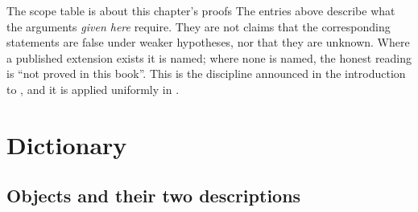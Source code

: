 \begin{warning}{The scope table is about this chapter's proofs}
The entries above describe what the arguments \emph{given here} require.
They are not claims that the corresponding statements are false under weaker
hypotheses, nor that they are unknown.  Where a published extension exists
it is named; where none is named, the honest reading is ``not proved in this
book''.  This is the discipline announced in the introduction to
, and it is applied uniformly in
.
\end{warning}

\section{Dictionary}
\label{sec:ch20-dictionary}

\subsection{Objects and their two descriptions}
\label{sec:ch20-dict-objects}

